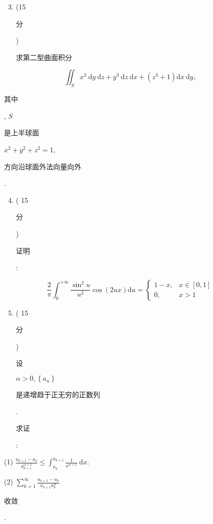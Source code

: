 \documentclass[10pt]{article}
\begin{document}
\begin{enumerate}
  \setcounter{enumi}{2}
  \item (15 \begin{CJK}{UTF8}{mj}分\end{CJK}) \begin{CJK}{UTF8}{mj}求第二型曲面积分\end{CJK}
\end{enumerate}
$$
\iint_{S} x^{3} \mathrm{~d} y \mathrm{~d} z+y^{3} \mathrm{~d} z \mathrm{~d} x+\left(z^{3}+1\right) \mathrm{d} x \mathrm{~d} y,
$$
\begin{CJK}{UTF8}{mj}其中\end{CJK}, $S$ \begin{CJK}{UTF8}{mj}是上半球面\end{CJK} $x^{2}+y^{2}+z^{2}=1$, \begin{CJK}{UTF8}{mj}方向沿球面外法向量向外\end{CJK}.

\begin{enumerate}
  \setcounter{enumi}{3}
  \item ( 15 \begin{CJK}{UTF8}{mj}分\end{CJK}) \begin{CJK}{UTF8}{mj}证明\end{CJK}:
\end{enumerate}
$$
\frac{2}{\pi} \int_{0}^{+\infty} \frac{\sin ^{2} u}{u^{2}} \cos (2 u x) \mathrm{d} u= \begin{cases}1-x, & x \in[0,1] \\ 0, & x>1\end{cases}
$$

\begin{enumerate}
  \setcounter{enumi}{4}
  \item ( 15 \begin{CJK}{UTF8}{mj}分\end{CJK}) \begin{CJK}{UTF8}{mj}设\end{CJK} $\alpha>0,\left\{a_{n}\right\}$ \begin{CJK}{UTF8}{mj}是递增趋于正无穷的正数列\end{CJK}. \begin{CJK}{UTF8}{mj}求证\end{CJK}:
\end{enumerate}
(1) $\frac{a_{k+1}-a_{k}}{a_{k+1}^{\alpha+1}} \leqslant \int_{a_{k}}^{a_{k+1}} \frac{1}{x^{\alpha+1}} \mathrm{~d} x$.

(2) $\sum_{k=1}^{\infty} \frac{a_{k+1}-a_{k}}{a_{k+1} a_{k}^{\alpha}}$ \begin{CJK}{UTF8}{mj}收敛\end{CJK}.
\end{document}
